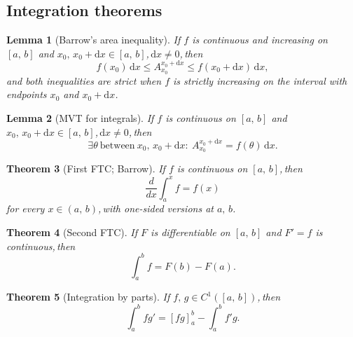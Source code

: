 \documentclass[11pt,reqno]{amsart}
\newcommand{\comma}{,\,\allowbreak}
\theoremstyle{redplain}
\newtheorem{theorem}{Theorem}
\newtheorem{lemma}[theorem]{Lemma}
\begin{document}
\subsection{Integration theorems}

\begin{lemma}[Barrow's area inequality]
	\label{lem:barrow-area}
	If $f$ is continuous and increasing on $[a\comma b]$ and $x_0\comma x_0+\mathrm{d}x\in[a\comma b]$\comma $\mathrm{d}x\ne0$\comma then
	\begin{equation}\label{eq:barrow-area}
	f(x_0)\,\mathrm{d}x\le A_{x_0}^{x_0+\mathrm{d}x}\le f(x_0+\mathrm{d}x)\,\mathrm{d}x,
	\end{equation}
	and both inequalities are strict when $f$ is strictly increasing on the interval with endpoints $x_0$ and $x_0+\mathrm{d}x$.
\end{lemma}

\begin{lemma}[MVT for integrals]
	\label{lem:mvt-int}
	If $f$ is continuous on $[a\comma b]$ and $x_0\comma x_0+\mathrm{d}x\in[a\comma b]$\comma $\mathrm{d}x\ne0$\comma then
	\begin{equation}\label{eq:mvt-int}
	\exists\theta\ \text{between}\ x_0\comma x_0+\mathrm{d}x:\ A_{x_0}^{x_0+\mathrm{d}x}=f(\theta)\,\mathrm{d}x.
	\end{equation}
\end{lemma}

\begin{theorem}[First FTC; Barrow]
	\label{thm:fftc}
	If $f$ is continuous on $[a\comma b]$\comma then
	\begin{equation}\label{eq:fftc}
	\frac{d}{dx}\int_a^x f=f(x)
	\end{equation}
	for every $x\in(a\comma b)$\comma with one-sided versions at $a\comma b$.
\end{theorem}

\begin{theorem}[Second FTC]
	\label{thm:second-ftc}
	If $F$ is differentiable on $[a\comma b]$ and $F'=f$ is continuous\comma then
	\begin{equation}\label{eq:second-ftc}
	\int_a^b f=F(b)-F(a).
	\end{equation}
\end{theorem}

\begin{theorem}[Integration by parts]
	\label{thm:ibp}
	If $f\comma g\in C^1([a\comma b])$\comma then
	\begin{equation}\label{eq:ibp}
	\int_a^b fg'=[fg]_a^b-\int_a^b f'g.
	\end{equation}
\end{theorem}
\end{document}
